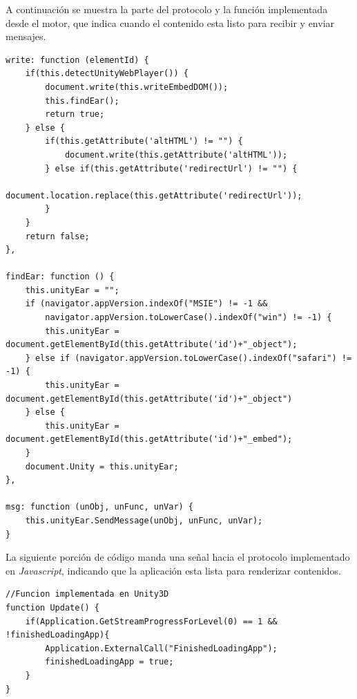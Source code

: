 A continuación se muestra la parte del protocolo y la función implementada desde el motor, que indica cuando el contenido esta listo para recibir y enviar mensajes.

\begin{verbatim}
write: function (elementId) {
    if(this.detectUnityWebPlayer()) {
        document.write(this.writeEmbedDOM());
        this.findEar();
        return true;
    } else {
        if(this.getAttribute('altHTML') != "") {
            document.write(this.getAttribute('altHTML'));
        } else if(this.getAttribute('redirectUrl') != "") {
            document.location.replace(this.getAttribute('redirectUrl'));
        }
    }
    return false;
},

findEar: function () {
    this.unityEar = "";
    if (navigator.appVersion.indexOf("MSIE") != -1 && 
        navigator.appVersion.toLowerCase().indexOf("win") != -1) {
        this.unityEar = document.getElementById(this.getAttribute('id')+"_object");
    } else if (navigator.appVersion.toLowerCase().indexOf("safari") != -1) {
        this.unityEar = document.getElementById(this.getAttribute('id')+"_object")
    } else {
        this.unityEar = document.getElementById(this.getAttribute('id')+"_embed");
    }
    document.Unity = this.unityEar;
},
   
msg: function (unObj, unFunc, unVar) {
    this.unityEar.SendMessage(unObj, unFunc, unVar);
}
\end{verbatim}

La siguiente porción de código manda una señal hacia el protocolo implementado en \emph{Javascript}, indicando que la aplicación esta lista para renderizar contenidos.\\

\begin{verbatim}
//Funcion implementada en Unity3D
function Update() {
    if(Application.GetStreamProgressForLevel(0) == 1 && !finishedLoadingApp){
        Application.ExternalCall("FinishedLoadingApp");
        finishedLoadingApp = true;
    }
}
\end{verbatim}
